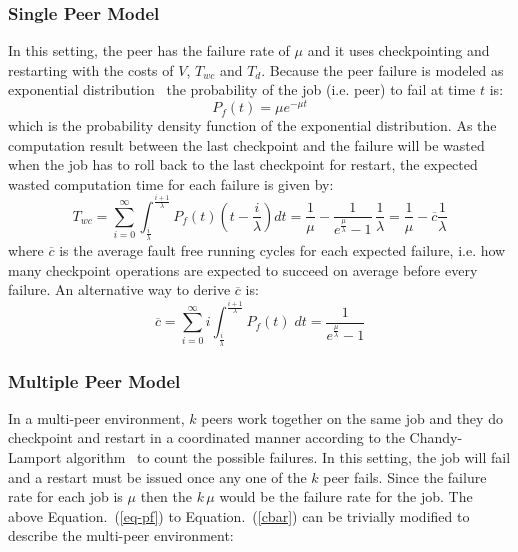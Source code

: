 \documentclass[times, 12pt, onecolumn]{article}
\newcommand{\refeq}[1]{Equation.~(\ref{#1})}
\begin{document}
\subsubsection{Single Peer Model}

In this setting, the peer has the failure rate of $\mu$ and it uses
checkpointing and restarting with the costs of $V$, $T_{wc}$ and $T_d$. Because
the peer failure is modeled as exponential distribution~\cite{tianjing07,
GhinitaT06} the probability of the job (i.e. peer) to fail at time $t$ is:
\begin{equation}
P_{f}(t)=\mu e^{- \mu t}
\label{eq-pf}
\end{equation}
which is the probability density function of the exponential distribution. As the computation result between the 
last checkpoint and the failure will be wasted when the job has to roll back to the last checkpoint for restart, 
the expected wasted computation time for each failure is given by:
\begin{equation}
T_{wc}=\sum_{i=0}^\infty{
\int_{\frac{i}{\lambda}}^{\frac{i+1}{\lambda}}{P_f(t) \left(t-\frac{i}{\lambda}\right)} dt}
=\frac{1}{\mu}-\frac{1}{e^{\frac{\mu}{\lambda}}-1}\, \frac{1}{\lambda}=\frac{1}{\mu} - \overline{c}\frac{1}{\lambda}
\end{equation}
where $\overline{c}$ is the average fault free running cycles for each expected
failure, i.e. how many checkpoint operations are expected to succeed on average
before every failure. An alternative way to derive $\overline{c}$ is:
\begin{equation}
\overline{c}=\sum_{i=0}^\infty{i \int_{\frac{i}{\lambda}}^{\frac{i+1}{\lambda}}{P_f(t)}\;dt}=
\frac{1}{e^{\frac{\mu}{\lambda}}-1}
\label{cbar}
\end{equation}


\subsubsection{Multiple Peer Model} 

In a multi-peer environment, $k$ peers work together on the same job and they do checkpoint and restart 
in a coordinated manner according to the Chandy-Lamport algorithm~\cite{ChandyL85} to count the possible failures. 
In this setting, the job will fail and a restart must be issued once any one of the $k$ peer fails. Since the 
failure rate for each job is $\mu$ then the $k\,\mu$ would be the failure rate for the job. The above \refeq{eq-pf} 
to \refeq{cbar} can be trivially modified to describe the multi-peer environment:
\end{document}
